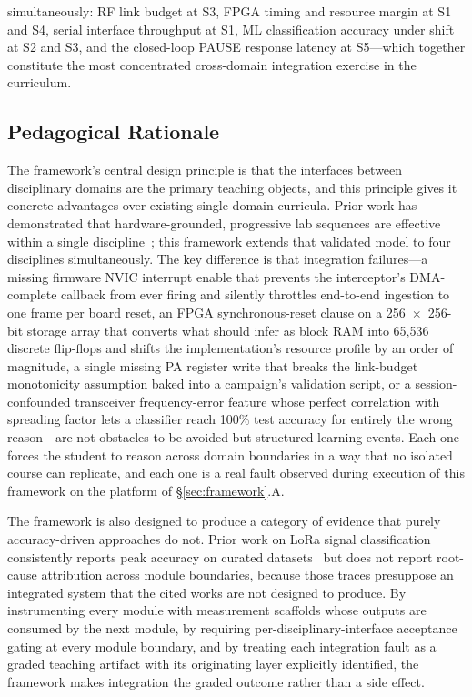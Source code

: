 \documentclass[conference]{IEEEtran}
\begin{document}
simultaneously: RF link budget at S3, FPGA timing and resource margin at S1 and S4, serial interface throughput at S1, ML classification accuracy under shift at S2 and S3, and the closed-loop PAUSE response latency at S5---which together constitute the most concentrated cross-domain integration exercise in the curriculum.

\subsection{Pedagogical Rationale}

The framework's central design principle is that the interfaces between disciplinary domains are the primary teaching objects, and this principle gives it concrete advantages over existing single-domain curricula. Prior work has demonstrated that hardware-grounded, progressive lab sequences are effective within a single discipline~\cite{b9,b10}; this framework extends that validated model to four disciplines simultaneously. The key difference is that integration failures---a missing firmware NVIC interrupt enable that prevents the interceptor's DMA-complete callback from ever firing and silently throttles end-to-end ingestion to one frame per board reset, an FPGA synchronous-reset clause on a 256~$\times$~256-bit storage array that converts what should infer as block RAM into 65{,}536 discrete flip-flops and shifts the implementation's resource profile by an order of magnitude, a single missing PA register write that breaks the link-budget monotonicity assumption baked into a campaign's validation script, or a session-confounded transceiver frequency-error feature whose perfect correlation with spreading factor lets a classifier reach 100\% test accuracy for entirely the wrong reason---are not obstacles to be avoided but structured learning events. Each one forces the student to reason across domain boundaries in a way that no isolated course can replicate, and each one is a real fault observed during execution of this framework on the platform of \S\ref{sec:framework}.A.

The framework is also designed to produce a category of evidence that purely accuracy-driven approaches do not. Prior work on LoRa signal classification consistently reports peak accuracy on curated datasets~\cite{b5,b6,b8} but does not report root-cause attribution across module boundaries, because those traces presuppose an integrated system that the cited works are not designed to produce. By instrumenting every module with measurement scaffolds whose outputs are consumed by the next module, by requiring per-disciplinary-interface acceptance gating at every module boundary, and by treating each integration fault as a graded teaching artifact with its originating layer explicitly identified, the framework makes integration the graded outcome rather than a side effect.
\end{document}
